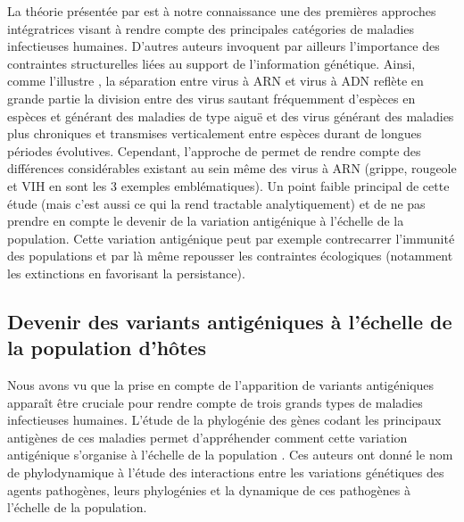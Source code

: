 La théorie présentée par \citet{Lange2009} est à notre connaissance
une des premières approches intégratrices visant à rendre compte des
principales catégories de maladies infectieuses humaines. D'autres
auteurs invoquent par ailleurs l'importance des contraintes
structurelles liées au support de l'information génétique. Ainsi,
comme l'illustre \citet{Holmes2008}, la séparation entre virus à ARN
et virus à ADN reflète en grande partie la division entre des virus
sautant fréquemment d'espèces en espèces et générant des maladies de
type aiguë et des virus générant des maladies plus chroniques et
transmises verticalement entre espèces durant de longues périodes
évolutives. Cependant, l'approche de \citet{Lange2009} permet de
rendre compte des différences considérables existant au sein même des
virus à ARN (grippe, rougeole et VIH en sont les 3 exemples
emblématiques). Un point faible principal de cette étude (mais c'est
aussi ce qui la rend tractable analytiquement) et de ne pas prendre en
compte le devenir de la variation antigénique à l'échelle de la
population. Cette variation antigénique peut par exemple contrecarrer
l'immunité des populations et par là même repousser les contraintes
écologiques (notamment les extinctions en favorisant la persistance).

\subsection{Devenir des variants antigéniques à l'échelle de la
  population d'hôtes}

Nous avons vu que la prise en compte de l'apparition de variants
antigéniques apparaît être cruciale pour rendre compte de trois grands
types de maladies infectieuses humaines. L'étude de la phylogénie des
gènes codant les principaux antigènes de ces maladies permet
d'appréhender comment cette variation antigénique s'organise à
l'échelle de la population \citep{Grenfell2004, Holmes2009}. Ces
auteurs ont donné le nom de phylodynamique à l'étude des interactions
entre les variations génétiques des agents pathogènes, leurs
phylogénies et la dynamique de ces pathogènes à l'échelle de la
population.

